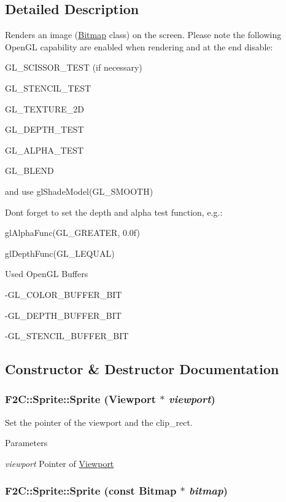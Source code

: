 \subsection{Detailed Description}
Renders an image (\hyperlink{class_f2_c_1_1_bitmap}{Bitmap} class) on the screen. Please note the following OpenGL capability are enabled when rendering and at the end disable: \par
 GL\_\-SCISSOR\_\-TEST (if necessary) \par
 GL\_\-STENCIL\_\-TEST \par
 GL\_\-TEXTURE\_\-2D \par
 GL\_\-DEPTH\_\-TEST \par
 GL\_\-ALPHA\_\-TEST \par
 GL\_\-BLEND \par
 and use glShadeModel(GL\_\-SMOOTH) \par
 \par
 Dont forget to set the depth and alpha test function, e.g.: \par
 glAlphaFunc(GL\_\-GREATER, 0.0f) \par
 glDepthFunc(GL\_\-LEQUAL) \par
 \par
 Used OpenGL Buffers \par
 -\/GL\_\-COLOR\_\-BUFFER\_\-BIT \par
 -\/GL\_\-DEPTH\_\-BUFFER\_\-BIT \par
 -\/GL\_\-STENCIL\_\-BUFFER\_\-BIT \par
 

\subsection{Constructor \& Destructor Documentation}
\hypertarget{class_f2_c_1_1_sprite_a858b8f2c06e804c19f6c6a5cbe760c1b}{
\subsubsection[{Sprite}]{\setlength{\rightskip}{0pt plus 5cm}F2C::Sprite::Sprite ({\bf Viewport} $\ast$ {\em viewport})}}
\label{class_f2_c_1_1_sprite_a858b8f2c06e804c19f6c6a5cbe760c1b}


Set the pointer of the viewport and the clip\_\-rect. 
\begin{DoxyParams}{Parameters}
\item[{\em viewport}]Pointer of \hyperlink{class_f2_c_1_1_viewport}{Viewport} \end{DoxyParams}
\hypertarget{class_f2_c_1_1_sprite_a18cd93c504d29dfc9df20dcde1968c45}{
\subsubsection[{Sprite}]{\setlength{\rightskip}{0pt plus 5cm}F2C::Sprite::Sprite (const {\bf Bitmap} $\ast$ {\em bitmap})}}
\label{class_f2_c_1_1_sprite_a18cd93c504d29dfc9df20dcde1968c45}


